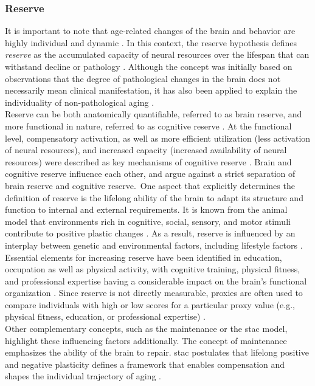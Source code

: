 \subsubsection{Reserve}
\label{theory:aging:reserve}
It is important to note that age-related changes of the brain and behavior are highly individual and dynamic \cite{Smith2020,Koen2019,Douw2014}. In this context, the reserve hypothesis defines \textit{reserve} as the accumulated capacity of neural resources over the lifespan that can withstand decline or pathology \cite{Cabeza2018, Stern2009}. Although the concept was initially based on observations that the degree of pathological changes in the brain does not necessarily mean clinical manifestation, it has also been applied to explain the individuality of non-pathological aging \cite{Esiri2001,Cabeza2018,Stern2009}.\\
Reserve can be both anatomically quantifiable, referred to as brain reserve, and more functional in nature, referred to as cognitive reserve \cite{Stern2009}. At the functional level, compensatory activation, as well as more efficient utilization (less activation of neural resources), and increased capacity (increased availability of neural resources) were described as key mechanisms of cognitive reserve \cite{Stern2004,Stern2009}. Brain and cognitive reserve influence each other, and \citeauthor{Cabeza2018} \cite{Cabeza2018} argue against a strict separation of brain reserve and cognitive reserve.\
One aspect that explicitly determines the definition of reserve is the lifelong ability of the brain to adapt its structure and function to internal and external requirements. It is known from the animal model that environments rich in cognitive, social, sensory, and motor stimuli contribute to positive plastic changes \cite{Fabel2009}. As a result, reserve is influenced by an interplay between genetic and environmental factors, including lifestyle factors \cite{Cabeza2018}. Essential elements for increasing reserve have been identified in education, occupation as well as physical activity, with cognitive training, physical fitness, and professional expertise having a considerable impact on the brain's functional organization \cite{Vieluf2018,Voss2016,Soldan2021}. Since reserve is not directly measurable, proxies are often used to compare individuals with high or low scores for a particular proxy value (e.g., physical fitness, education, or professional expertise) \cite{Cabeza2018}.\\
Other complementary concepts, such as the maintenance or the \gls{stac} model, highlight these influencing factors additionally. The concept of maintenance emphasizes the ability of the brain to repair. \Gls{stac} postulates that lifelong positive and negative plasticity defines a framework that enables compensation and shapes the individual trajectory of aging \cite{Reuter-Lorenz2014}. 


